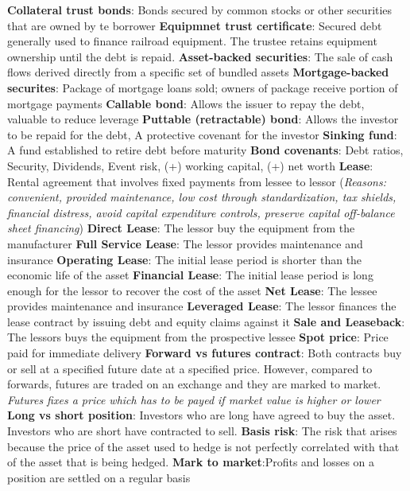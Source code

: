 \documentclass{cheatsheet}
\begin{document}
    \textbf{Collateral trust bonds}: Bonds secured by common stocks or other securities that are owned by te borrower
    \textbf{Equipmnet trust certificate}: Secured debt generally used to finance railroad equipment. The trustee retains equipment ownership until the debt is repaid.
    \textbf{Asset-backed securities}: The sale of cash flows derived directly from a specific set of bundled assets
    \textbf{Mortgage-backed securites}: Package of mortgage loans sold; owners of package receive portion of mortgage payments
    \textbf{Callable bond}: Allows the issuer to repay the debt, valuable to reduce leverage
    \textbf{Puttable (retractable) bond}: Allows the investor to be repaid for the debt, A protective covenant for the investor
    \textbf{Sinking fund}: A fund established to retire debt before maturity
    \textbf{Bond covenants}: Debt ratios, Security, Dividends, Event risk, (+) working capital, (+) net worth
    \textbf{Lease}: Rental agreement that involves fixed payments from lessee to lessor (\textit{Reasons: convenient, provided maintenance, low cost through standardization, tax shields, financial distress, avoid capital expenditure controls, preserve capital off-balance sheet financing})
    \textbf{Direct Lease}: The lessor buy the equipment from the manufacturer
    \textbf{Full Service Lease}: The lessor provides maintenance and insurance
    \textbf{Operating Lease}: The initial lease period is shorter than the economic life of the asset
    \textbf{Financial Lease}: The initial lease period is long enough for the lessor to recover the cost of the asset
    \textbf{Net Lease}: The lessee provides maintenance and insurance
    \textbf{Leveraged Lease}: The lessor finances the lease contract by issuing debt and equity claims against it
    \textbf{Sale and Leaseback}: The lessors buys the equipment from the prospective lessee
    \textbf{Spot price}: Price paid for immediate delivery
    \textbf{Forward vs futures contract}: Both contracts buy or sell at a specified future date at a specified price. However, compared to forwards, futures are traded on an exchange and they are marked to market. \textit{Futures fixes a price which has to be payed if market value is higher or lower}
    \textbf{Long vs short position}: Investors who are long have agreed to buy the asset. Investors who are short have contracted to sell.
    \textbf{Basis risk}: The risk that arises because the price of the asset used to hedge is not perfectly correlated with that of the asset that is being hedged.
    \textbf{Mark to market}:Profits and losses on a position are settled on a regular basis
\end{document}
